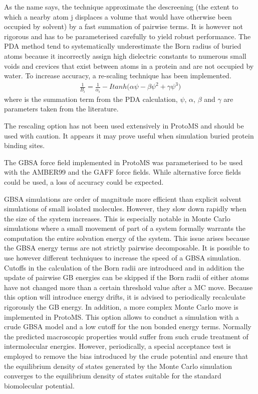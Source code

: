 \documentclass[letterpaper,10pt,english]{sphinxmanual}
\begin{document}
As the name says, the technique approximate the descreening (the extent to which a nearby atom j displaces a volume that would have otherwise been occupied by solvent) by a fast summation of pairwise terms. It is however not rigorous and has to be parameterised carefully to yield robust performance. The PDA method tend to systematically underestimate the Born radius of buried atoms because it incorrectly assign high dielectric constants to numerous small voids and crevices that exist between atoms in a protein and are not occupied by water. To increase accuracy, a re-scaling technique has been implemented.
\begin{equation*}
\begin{split}{\frac{1}{B_i}}  = \frac{1}{\alpha _{i}} - Itanh\big( \alpha \psi - \beta \psi^{2} + \gamma \psi^{3}  \big)\end{split}
\end{equation*}
where  is the summation term from the PDA calculation, \(\psi\), \(\alpha\), \(\beta\) and \(\gamma\) are parameters taken from the literature.

The rescaling option has not been used extensively in ProtoMS and should be used with caution. It appears it may prove useful when simulation buried protein binding sites.

The GBSA force field implemented in ProtoMS was parameterised to be used with the AMBER99 and the GAFF force fields. While alternative force fields could be used, a loss of accuracy could be expected.

GBSA simulations are order of magnitude more efficient than explicit solvent simulations of small isolated molecules. However, they slow
down rapidly when the size of the system increases. This is especially notable in Monte Carlo simulations where a small movement of part of a system formally warrants the computation the entire solvation energy of the system. This issue arises because the GBSA energy terms are not strictly pairwise decomposable.  It is possible to use however different techniques to increase the speed of a GBSA simulation. Cutoffs in the calculation of the Born radii are introduced and in addition the update of pairwise GB energies can be skipped if the Born radii of either atoms have not changed more than a certain threshold value after a MC move. Because this option will introduce energy drifts, it is advised to periodically recalculate rigorously the GB energy. In addition, a more complex Monte Carlo move is implemented in ProtoMS. This option allows to conduct a simulation with a crude GBSA model and a low cutoff for the non bonded energy terms. Normally the  predicted macroscopic properties would suffer from such crude treatment of intermolecular energies. However, periodically, a special acceptance test is employed to remove the bias introduced by the crude potential and ensure that the equilibrium density of states generated by the Monte Carlo simulation converges to the equilibrium density of states suitable for the standard biomolecular potential.
\end{document}
